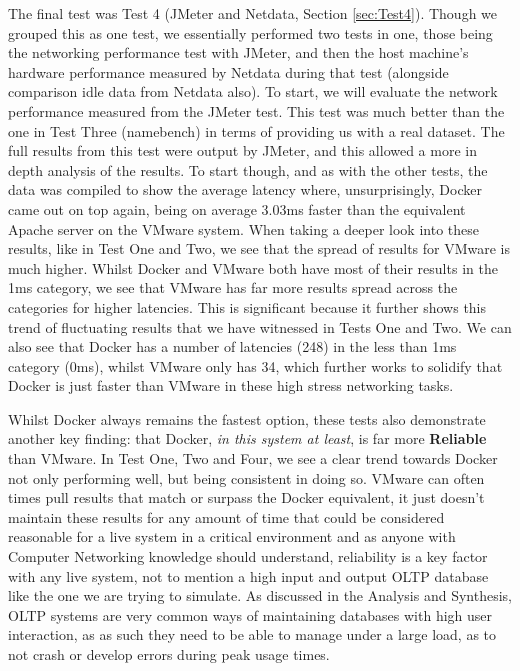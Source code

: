The final test was Test 4 (JMeter and Netdata, Section \ref{sec:Test4}). Though we grouped this as one test, we essentially performed two tests in one, those being the networking performance test with JMeter, and then the host machine's hardware performance measured by Netdata during that test (alongside comparison idle data from Netdata also). To start, we will evaluate the network performance measured from the JMeter test. This test was much better than the one in Test Three (namebench) in terms of providing us with a real dataset. The full results from this test were output by JMeter, and this allowed a more in depth analysis of the results. To start though, and as with the other tests, the data was compiled to show the average latency where, unsurprisingly, Docker came out on top again, being on average  3.03ms faster than the equivalent Apache server on the VMware system. When taking a deeper look into these results, like in Test One and Two, we see that the spread of results for VMware is much higher. Whilst Docker and VMware both have most of their results in the 1ms category, we see that VMware has far more results spread across the categories for higher latencies. This is significant because it further shows this trend of fluctuating results that we have witnessed in Tests One and Two. We can also see that Docker has a number of latencies (248) in the less than 1ms category (0ms), whilst VMware only has 34, which further works to solidify that Docker is just faster than VMware in these high stress networking tasks.

Whilst Docker always remains the fastest option, these tests also demonstrate another key finding: that Docker, \emph{in this system at least}, is far more \textbf{Reliable} than VMware. In Test One, Two and Four, we see a clear trend towards Docker not only performing well, but being consistent in doing so. VMware can often times pull results that match or surpass the Docker equivalent, it just doesn't maintain these results for any amount of time that could be considered reasonable for a live system in a critical environment and as anyone with Computer Networking knowledge should understand, reliability is a key factor with any live system, not to mention a high input and output OLTP database like the one we are trying to simulate. As discussed in the Analysis and Synthesis, OLTP systems are very common ways of maintaining databases with high user interaction, as as such they need to be able to manage under a large load, as to not crash or develop errors during peak usage times.

